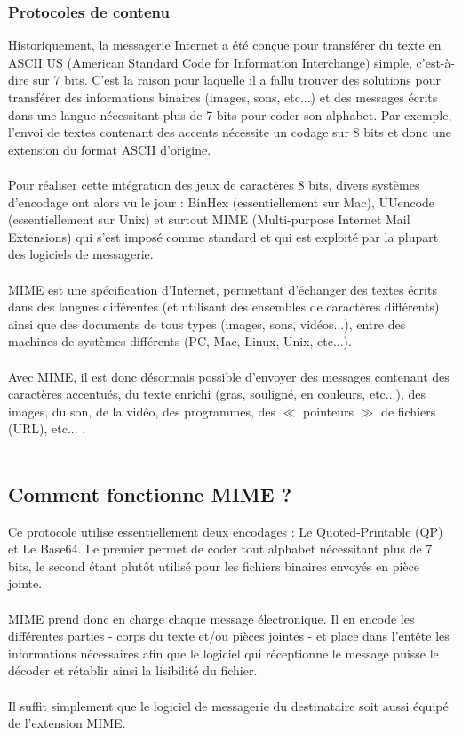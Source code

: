 \documentclass[french]{report}
\begin{document}
\begin{titlepage}
\subsubsection{\LARGE Protocoles de contenu}
\LARGE
Historiquement, la messagerie Internet a été conçue pour transférer du texte en ASCII US (American Standard Code for Information Interchange) simple, c'est-à-dire sur 7 bits. C'est la raison pour laquelle il a fallu trouver des solutions pour transférer des informations binaires (images, sons, etc...) et des messages écrits dans une langue nécessitant plus de 7 bits pour coder son alphabet. Par exemple, l'envoi de textes contenant des accents nécessite un codage sur 8 bits et donc une extension du format ASCII d'origine.\\ \\
Pour réaliser cette intégration des jeux de caractères 8 bits, divers systèmes d'encodage ont alors vu le jour : BinHex (essentiellement sur Mac), UUencode (essentiellement sur Unix) et surtout MIME (Multi-purpose Internet Mail Extensions) qui s'est imposé comme standard et qui est exploité par la plupart des logiciels de messagerie.\\ \\
MIME est une spécification d'Internet, permettant d'échanger des textes écrits dans des langues différentes (et utilisant des ensembles de caractères différents) ainsi que des documents de tous types (images, sons, vidéos...), entre des machines de systèmes différents (PC, Mac, Linux, Unix, etc...).\\ \\
Avec MIME, il est donc désormais possible d'envoyer des messages contenant des caractères accentués, du texte enrichi (gras, souligné, en couleurs, etc...), des images, du son, de la vidéo, des programmes, des $\ll$ pointeurs $\gg$ de fichiers (URL), etc...  .\\ \\
\subsection*{\LARGE Comment fonctionne MIME ?}
\LARGE Ce protocole utilise essentiellement deux encodages : Le Quoted-Printable (QP) et Le Base64. Le premier permet de coder tout alphabet nécessitant plus de 7 bits, le second étant plutôt utilisé pour les fichiers binaires envoyés en pièce jointe.\\ \\
MIME prend donc en charge chaque message électronique. Il en encode les différentes parties - corps du texte et/ou pièces jointes - et place dans l'entête les informations nécessaires afin que le logiciel qui réceptionne le message puisse le décoder et rétablir ainsi la lisibilité du fichier.\\ \\
Il suffit simplement que le logiciel de messagerie du destinataire soit aussi équipé de l'extension MIME.
\newpage

\end{titlepage}
\end{document}
